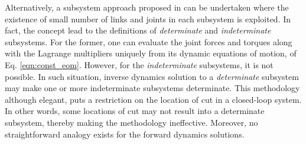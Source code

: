 {Alternatively, a subsystem approach proposed in \citet{chaudhary2008dynamics} can be undertaken where the existence of small number of links and joints in each subsystem is exploited. In fact, the concept lead to the definitions of \emph{determinate} and \emph{indeterminate} subsystems. For the former, one can evaluate the joint forces and torques along with the Lagrange multipliers uniquely from its dynamic equations of motion, of Eq. \ref{eqn:const_eom}. However, for the \emph{indeterminate} subsystems, it is not possible. In such situation, inverse dynamics solution to a \emph{determinate} subsystem may make one or more indeterminate subsystems determinate. 
This methodology although elegant, puts a restriction on the location of cut in a closed-loop system. In other words, some locations of cut may not result into a determinate subsystem, thereby making the methodology ineffective. Moreover, no straightforward analogy exists for the forward dynamics solutions.

}
